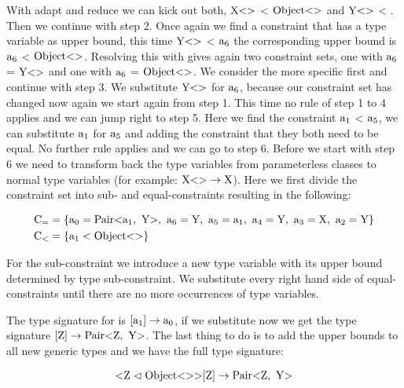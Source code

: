 With adapt and reduce we can kick out both, $\text{X} \text{<}  \text{>}$ < $\text{Object} \text{<}  \text{>}$ and $\text{Y} \text{<}  \text{>}$ < . Then we continue with step 2.
Once again we find a constraint that has a type variable as upper bound, this time $\text{Y} \text{<}  \text{>}$ < $\text{a}_{6}$ the corresponding upper bound is $\text{a}_{6}$ < $\text{Object} \text{<}  \text{>}$.
Resolving this with  gives again two constraint sets, one with $\text{a}_{6}$ = $\text{Y} \text{<}  \text{>}$ and one with $\text{a}_{6}$ = $\text{Object} \text{<}  \text{>}$. We consider the more specific first and continue with step 3.
We substitute $\text{Y} \text{<}  \text{>}$ for $\text{a}_{6}$, because our constraint set has changed now again we start again from step 1. This time no rule of step 1 to 4 applies and we can jump right to step 5.
Here we find the constraint $\text{a}_{1}$ < $\text{a}_{5}$, we can substitute $\text{a}_{1}$ for $\text{a}_{5}$ and adding the constraint that they both need to be equal.
No further rule applies and we can go to step 6. Before we start with step 6 we need to transform back the type variables from parameterless classes to normal type variables (for example: $\text{X} \text{<}  \text{>} \to \text{X}$). Here we first divide the constraint set into sub- and equal-constraints resulting in the following:

\begin{align*}
    \text{C}_= &= \{ \fa{0} = \nvtt{Pair}{\fa{1}, \ \text{Y}}, \ \fa{6} = \text{Y}, \ \fa{5} = \fa{1}, \ \fa{4} = \text{Y}, \ \fa{3} = \text{X}, \ \fa{2} = \text{Y} \}\\
    \text{C}_< &= \{ \fa{1} < \nvtt{Object}{} \}
\end{align*}

For the sub-constraint we introduce a new type variable  with its upper bound determined by type sub-constraint.
We substitute every right hand side of equal-constraints until there are no more occurrences of type variables.

The type signature for  is $[\text{a}_{1}] \to \text{a}_{0}$, if we substitute now we get the type signature $[\text{Z}] \to \nvtt{Pair}{\text{Z}, \ \text{Y}}$.
The last thing to do is to add the upper bounds to all new generic types and we have the full type signature:

\begin{align*}
    \text{<} \text{Z} \vartriangleleft \nvtt{Object}{}\text{>}[\text{Z}] \to \nvtt{Pair}{\text{Z}, \ \text{Y}}
\end{align*}
